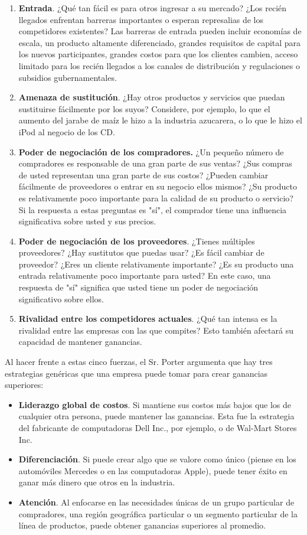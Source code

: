 \documentclass[10pt]{book}
\begin{document}
\begin{enumerate}[\bfseries 1.]
\item  \textbf{Entrada}. ¿Qué tan fácil es para otros ingresar a su mercado? ¿Los recién llegados enfrentan barreras importantes o esperan represalias de los competidores existentes? Las barreras de entrada pueden incluir economías de escala, un producto altamente diferenciado, grandes requisitos de capital para los nuevos participantes, grandes costos para que los clientes cambien, acceso limitado para los recién llegados a los canales de distribución y regulaciones o subsidios gubernamentales.
\item  \textbf{Amenaza de sustitución}. ¿Hay otros productos y servicios que puedan sustituirse fácilmente por los suyos? Considere, por ejemplo, lo que el aumento del jarabe de maíz le hizo a la industria azucarera, o lo que le hizo el iPod al negocio de los CD.\\
\item \textbf{Poder de negociación de los compradores.} ¿Un pequeño número de compradores es responsable de una gran parte de sus ventas? ¿Sus compras de usted representan una gran parte de sus costos? ¿Pueden cambiar fácilmente de proveedores o entrar en su negocio ellos mismos? ¿Su producto es relativamente poco importante para la calidad de su producto o servicio? Si la respuesta a estas preguntas es "sí", el comprador tiene una influencia significativa sobre usted y sus precios.
\item \textbf{Poder de negociación de los proveedores}. ¿Tienes múltiples proveedores? ¿Hay sustitutos que puedas usar? ¿Es fácil cambiar de proveedor? ¿Eres un cliente relativamente importante? ¿Es su producto una entrada relativamente poco importante para usted? En este caso, una respuesta de "sí" significa que usted tiene un poder de negociación significativo sobre ellos.
\item \textbf{Rivalidad entre los competidores actuales}. ¿Qué tan intensa es la rivalidad entre las empresas con las que compites? Esto también afectará su capacidad de mantener ganancias.
\end{enumerate}
Al hacer frente a estas cinco fuerzas, el Sr. Porter argumenta que hay tres estrategias genéricas que una empresa puede tomar para crear ganancias superiores:
\begin{itemize}
\item \textbf{Liderazgo global de costos}. Si mantiene sus costos más bajos que los de cualquier otra persona, puede mantener las ganancias. Esta fue la estrategia del fabricante de computadoras Dell Inc., por ejemplo, o de Wal-Mart Stores Inc.
\item \textbf{Diferenciación}. Si puede crear algo que se valore como único (piense en los automóviles Mercedes o en las computadoras Apple), puede tener éxito en ganar más dinero que otros en la industria.
\item \textbf{Atención}. Al enfocarse en las necesidades únicas de un grupo particular de compradores, una región geográfica particular o un segmento particular de la línea de productos, puede obtener ganancias superiores al promedio.
\end{itemize}
\end{document}
